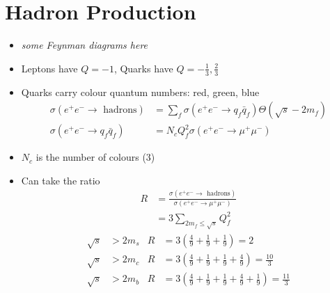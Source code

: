 \documentclass[a4paper, 11pt, normalem]{report}
\begin{document}
\section{Hadron Production}
\begin{itemize}
    \item \textit{some Feynman diagrams here}
    \item Leptons have $Q=-1$, Quarks have $Q=-\frac13,\frac23$
    \item Quarks carry colour quantum numbers: red, green, blue
        \begin{align}
            \sigma(e^+e^-\to\text{ hadrons}) &= \sum_f \sigma(e^+e^-\to q_f\bar{q}_f)\Theta(\sqrt{s}-2m_f) \\
            \sigma(e^+e^-\to q_f\bar{q}_f) &= N_cQ_f^2\sigma(e^+e^-\to\mu^+\mu^-)
        \end{align}
    \item $N_c$ is the number of colours (3)
    \item Can take the ratio
        \begin{align}
            R &= \frac{\sigma(e^+e^-\to \text{ hadrons})}{\sigma(e^+e^-\to\mu^+\mu^-)} \\
              &= 3\sum_{2m_f\leq\sqrt{s}} Q_f^2
        \end{align}
        \begin{align}
            \sqrt{s} &> 2m_s & R &= 3\left(\frac49+\frac19+\frac19\right) = 2 \\
            \sqrt{s} &> 2m_c & R &= 3\left(\frac49+\frac19+\frac19+\frac49\right) = \frac{10}{3} \\
            \sqrt{s} &> 2m_b & R &= 3\left(\frac49+\frac19+\frac19+\frac49+\frac19\right) = \frac{11}{3}
        \end{align}
\end{itemize}
\begin{figure}[H]
    \centering
\end{figure}
\end{document}
